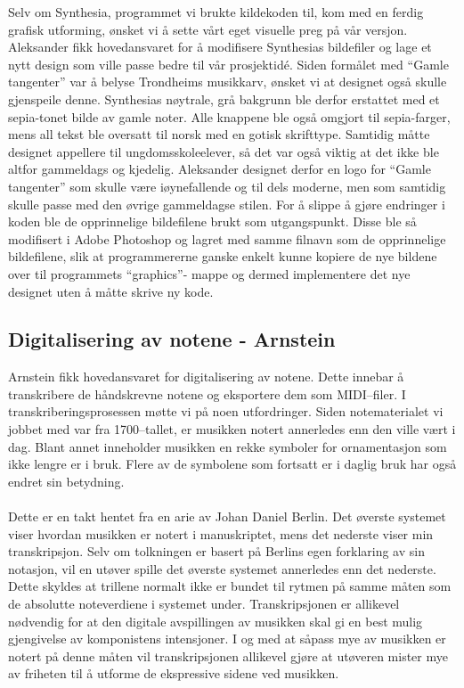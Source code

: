 Selv om Synthesia, programmet vi brukte kildekoden til, kom med en ferdig grafisk utforming, ønsket vi å sette vårt eget visuelle preg på vår versjon. Aleksander fikk hovedansvaret for å modifisere Synthesias bildefiler og lage et nytt design som ville passe bedre til vår prosjektidé.
Siden formålet med “Gamle tangenter” var å belyse Trondheims musikkarv, ønsket vi at designet også skulle gjenspeile denne. Synthesias nøytrale, grå bakgrunn ble derfor erstattet med et sepia-tonet bilde av gamle noter. Alle knappene ble også omgjort til sepia-farger, mens all tekst ble oversatt til norsk med en gotisk skrifttype.
Samtidig måtte designet appellere til ungdomsskoleelever, så det var også viktig at det ikke ble altfor gammeldags og kjedelig. Aleksander designet derfor en logo for “Gamle tangenter” som skulle være iøynefallende og til dels moderne, men som samtidig skulle passe med den øvrige gammeldagse stilen.
For å slippe å gjøre endringer i koden ble de opprinnelige bildefilene brukt som utgangspunkt. Disse ble så modifisert i Adobe Photoshop og lagret med samme filnavn som de opprinnelige bildefilene, slik at programmererne ganske enkelt kunne kopiere de nye bildene over til programmets “graphics”- mappe og dermed implementere det nye designet uten å måtte skrive ny kode.

\subsection{Digitalisering av notene - Arnstein}
Arnstein fikk hovedansvaret for digitalisering av notene. Dette innebar å transkribere de håndskrevne notene og eksportere dem som MIDI–filer.
I transkriberingsprosessen møtte vi på noen utfordringer. Siden notematerialet vi jobbet med var fra 1700–tallet, er musikken notert annerledes enn den ville vært i dag. Blant annet inneholder musikken en rekke symboler for ornamentasjon som ikke lengre er i bruk. Flere av de symbolene som fortsatt er i daglig bruk har også endret sin betydning. \\\\

Dette er en takt hentet fra en arie av Johan Daniel Berlin. Det øverste systemet viser hvordan musikken er notert i manuskriptet, mens det nederste viser min transkripsjon. Selv om tolkningen er basert på Berlins egen forklaring av sin notasjon, vil en utøver spille det øverste systemet annerledes enn det nederste. Dette skyldes at trillene normalt ikke er bundet til rytmen på samme måten som de absolutte noteverdiene i systemet under. Transkripsjonen er allikevel nødvendig for at den digitale avspillingen av musikken skal gi en best mulig gjengivelse av komponistens intensjoner. I og med at såpass mye av musikken er notert på denne måten vil transkripsjonen allikevel gjøre at utøveren mister mye av friheten til å utforme de ekspressive sidene ved musikken.\\\\

